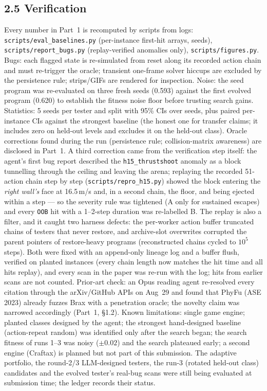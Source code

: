 \subsection*{2.5 Verification}
Every number in Part~1 is recomputed by scripts from logs: \texttt{scripts/eval\_baselines.py} (per-instance first-hit arrays,
seeds), \texttt{scripts/report\_bugs.py} (replay-verified anomalies only), \texttt{scripts/figures.py}. Bugs: each flagged state is
re-simulated from reset along its recorded action chain and must re-trigger the oracle; transient one-frame solver hiccups are
excluded by the persistence rule; strips/GIFs are rendered for inspection. Noise: the seed program was re-evaluated on three fresh
seeds (0.593) against the first evolved program (0.620) to establish the fitness noise floor before trusting search gains.
Statistics: 5 seeds per tester and split with 95\% CIs over seeds, plus paired per-instance CIs against the strongest baseline
(the honest one for transfer claims; it includes zero on held-out levels and excludes it on the held-out class). Oracle corrections
found during the run (persistence rule; collision-matrix awareness) are disclosed in Part~1. A third correction came from the
verification step itself: the agent's first bug report described the \texttt{h15\_thrustshoot} anomaly as a block tunnelling through the
ceiling and leaving the arena; replaying the recorded 51-action chain step by step (\texttt{scripts/repro\_h15.py}) showed the block
entering the \emph{right wall's} face at 16.5\,m/s and, in a second chain, the floor, and being ejected within a step --- so the severity
rule was tightened (A only for sustained escapes) and every \texttt{OOB} hit with a 1--2-step duration was re-labelled B. The replay is also a filter, and it caught two harness defects: the per-worker action buffer truncated chains of testers that
never restore, and archive-slot overwrites corrupted the parent pointers of restore-heavy programs (reconstructed chains cycled to
$10^5$ steps). Both were fixed with an append-only lineage log and a buffer flush, verified on planted instances (every chain length
now matches the hit time and all hits replay), and every scan in the paper was re-run with the log; hits from earlier scans are not counted. Prior-art check: an Opus reading
agent re-resolved every citation through the arXiv/GitHub APIs on Aug~29 and found that PhyFu (ASE 2023) already fuzzes Brax with
a penetration oracle; the novelty claim was narrowed accordingly (Part~1, \S1.2).
Known limitations: single game engine; planted classes designed by the agent; the strongest hand-designed baseline
(action-repeat random) was identified only after the search began; the search fitness of runs 1--3 was noisy ($\pm0.02$) and the
search plateaued early; a second engine (Craftax) is planned but not part of this submission. The adaptive portfolio, the
round-2/3 LLM-designed testers, the run-3 (rotated held-out class) candidates and the evolved tester's real-bug scans were still
being evaluated at submission time; the ledger records their status.

